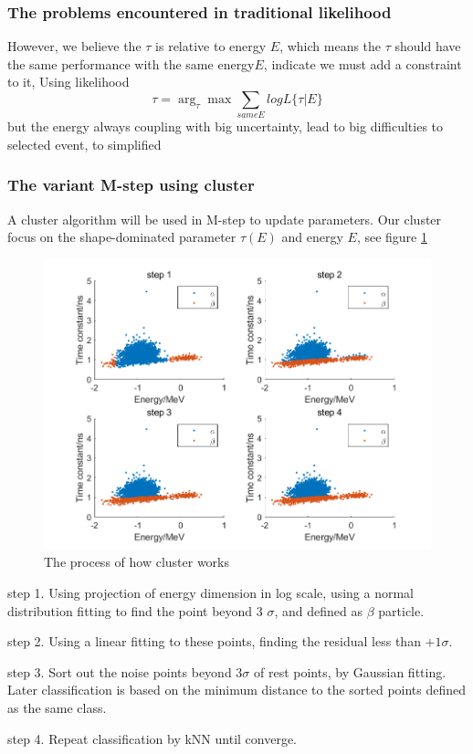 \documentclass{article}
\begin{document}
\subsubsection{The problems encountered in traditional likelihood}
\par However, we believe the $\tau$ is relative to energy $E$, which means the $\tau$ should have the same performance with the same energy$E$, indicate we must add a constraint to it, Using likelihood 
$$ \tau = \arg_\tau\max\sum_{same E}log L{\{\tau|E\}} $$
but the energy always coupling with big uncertainty, lead to big difficulties to selected event, to simplified

\subsubsection{The variant M-step using cluster}
\par A cluster algorithm will be used in M-step to update parameters. Our cluster focus on the shape-dominated parameter $\tau(E)$ and energy $E$, see figure \ref{fig:2}

	\begin{figure}[h]
	\centering\includegraphics[width=5 in]{./figure/figure1.png}
	\caption{The process of how cluster works }
	\label{fig:2}
	\end{figure}
	
	\par step 1. Using projection of energy dimension in log scale, using a normal distribution fitting to find the point beyond 3 $\sigma$, and defined as $\beta$ particle.
	\par step 2. Using a linear fitting to these points, finding the residual less than $+1 \sigma$. 
	\par step 3. Sort out the noise points beyond $3\sigma$ of rest points, by Gaussian fitting. Later classification is based on the minimum distance to the sorted points defined as the same class. 
	\par step 4. Repeat classification by kNN until converge.
	
\end{document}
